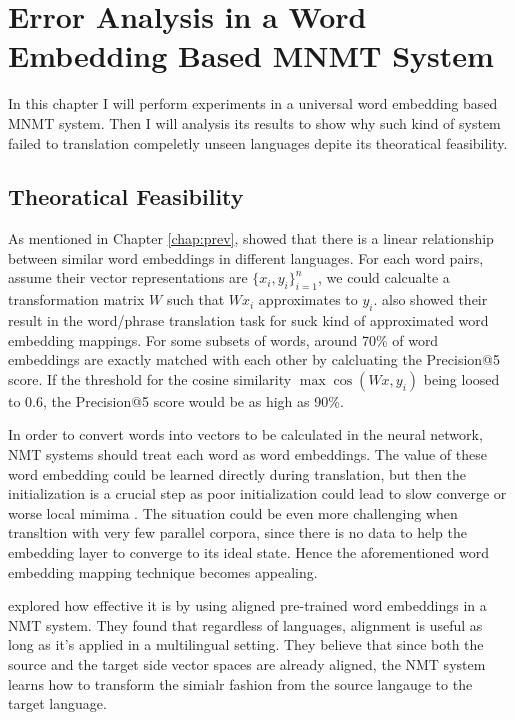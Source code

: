 \documentclass[thesis,fonts=libertine]{cluu}
\begin{document}
\chapter{Error Analysis in a Word Embedding Based MNMT System}
\label{chap:error_analysis}

In this chapter I will perform experiments in a universal word embedding based MNMT system. Then I will analysis its results to show why such kind of system failed to translation compeletly unseen languages depite its theoratical feasibility.

\section{Theoratical Feasibility}

As mentioned in Chapter \ref{chap:prev}, \cite{Mikolov:2013ac} showed that there is a linear relationship between similar word embeddings in different languages. For each word pairs, assume their vector representations are $\{x_i, y_i\}_{i=1}^n$, we could calcualte a transformation matrix $W$ such that $Wx_i$ approximates to $y_i$. \cite{Mikolov:2013ac} also showed their result in the word/phrase translation task for suck kind of approximated word embedding mappings. For some subsets of words, around 70\% of word embeddings are exactly matched with each other by calcluating the Precision@5 score. If the threshold for the cosine similarity $\max\cos(Wx, y_i)$ being loosed to 0.6, the Precision@5 score would be as high as 90\%.

In order to convert words into vectors to be calculated in the neural network, NMT systems should treat each word as word embeddings. The value of these word embedding could be learned directly during translation, but then the initialization is a crucial step as poor initialization could lead to slow converge or worse local mimima \parencite{glorot2010understanding}. The situation could be even more challenging when transltion with very few parallel corpora, since there is no data to help the embedding layer to converge to its ideal state. Hence the aforementioned word embedding mapping technique becomes appealing.

\cite{Qi:2018aa} explored how effective it is by using aligned pre-trained word embeddings in a NMT system. They found that regardless of languages, alignment is useful as long as it's applied in a multilingual setting. They believe that since both the source and the target side vector spaces are already aligned, the NMT system learns how to transform the simialr fashion from the source langauge to the target language.
\end{document}
